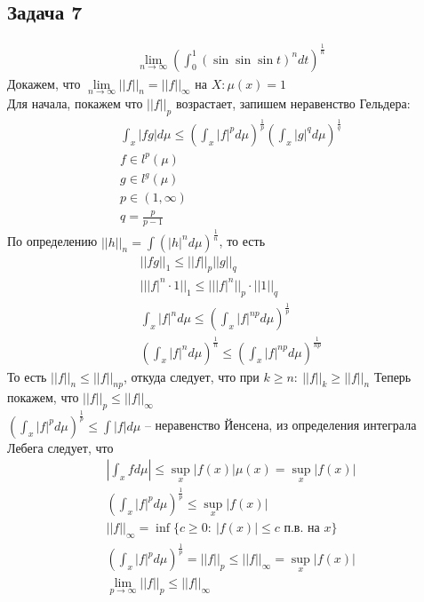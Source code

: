 \subsection*{Задача 7}
	\begin{gather*}
		\lim\limits_{n \to \infty}\left(\int_{0}^{1}(\sin\sin\sin t)^n dt \right)^{\frac{1}{n}}
	\end{gather*}
	Докажем, что $\lim\limits_{n \to \infty} ||f||_n = ||f||_{\infty}$ на $X: \mu(x) = 1$\\
	Для начала, покажем что $||f||_p$ возрастает, запишем неравенство Гельдера:
	\begin{gather*}
		\int_{x} |fg| d\mu \leqslant (\int_{x} |f|^p d \mu)^{\frac{1}{p}} (\int_{x} |g|^{q} d\mu)^{\frac{1}{q}}\\
		f \in l^p(\mu)\\
		g \in l^{g}(\mu)\\
		p \in (1, \infty)\\
		q = \frac{p}{p-1}
	\end{gather*}
	По определению $||h||_n = \int(|h|^n d\mu)^{\frac{1}{n}}$, то есть
	\begin{gather*}
		||fg||_1 \leqslant ||f||_p ||g||_q\\
		|||f|^n \cdot 1||_1 \leqslant |||f|^n||_p \cdot ||1||_q\\
		\int_{x} |f|^n d\mu \leqslant (\int_{x} |f|^{np} d\mu)^{\frac{1}{p}}\\
		(\int_{x} |f|^n d\mu)^{\frac{1}{n}} \leqslant (\int_{x} |f|^{np} d\mu)^{\frac{1}{np}}
	\end{gather*}
	То есть $||f||_n \leqslant ||f||_{np}$, откуда следует, что при $k \geqslant n:\ ||f||_k \geqslant ||f||_n$
	\vskip 0.2in
	Теперь покажем, что $||f||_p \leqslant ||f||_{\infty}$\\
	$(\int_{x} |f|^p d\mu)^{\frac{1}{p}} \leqslant \int |f| d\mu$ -- неравенство Йенсена, из определения интеграла Лебега следует, что 
	\begin{gather*}
		|\int_{x} f d\mu| \leqslant \sup\limits_{x} |f(x)|\mu(x) = \sup\limits_{x}|f(x)|\\
		(\int_{x} |f|^{p} d \mu)^{\frac{1}{p}} \leqslant \sup\limits_{x} |f(x)|\\
		||f||_{\infty} = \inf\{c \geqslant 0:\ |f(x)|\leqslant c \text{ п.в. на } x\}\\
		(\int_{x} |f|^{p} d\mu)^{\frac{1}{p}} = ||f||_p \leqslant ||f||_{\infty} = \sup\limits_{x} |f(x)|\\
		\lim\limits_{p \to \infty} ||f||_p \leqslant ||f||_{\infty}
	\end{gather*}
